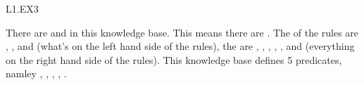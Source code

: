 \begin{mozartANSWER}{L1.EX3}\begin{mozartCODEDISPLAY}\end{mozartCODEDISPLAY}
 \mozartEMPTY
 \mozartEMPTY
There are  and  in this knowledge base. This means there \mozartEMPTY
are . The  of the rules are , \mozartEMPTY
{}, and  (what's on the left hand \mozartEMPTY
side of the rules), the  are \mozartEMPTY
{}, , , , \mozartEMPTY
{}, and  (everything on the right hand \mozartEMPTY
side of the rules). This knowledge base defines 5 predicates, namley \mozartEMPTY
{}, , , \mozartEMPTY
{}, . \mozartEMPTY
\end{mozartANSWER}
